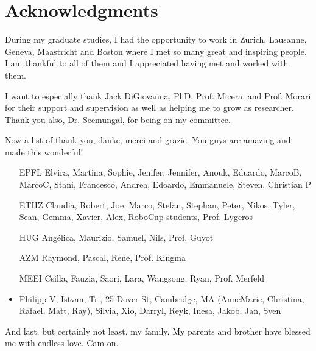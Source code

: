 
\begingroup
\let\clearpage\relax
\let\cleardoublepage\relax
\let\cleardoublepage\relax

\chapter*{Acknowledgments}
During my graduate studies, I had the opportunity to work in Zurich, Lausanne, Geneva, Maastricht and Boston where I met so many great and inspiring people. I am thankful to all of them and I appreciated having met and worked with them.

I want to especially thank Jack DiGiovanna, PhD, Prof. Micera, and Prof. Morari for their support and supervision as well as helping me to grow as researcher. Thank you also, Dr. Seemungal, for being on my committee.

Now a list of thank you, danke, merci and grazie. You guys are amazing and made this wonderful!
\begin{itemize}
\item[EPFL] Elvira, Martina, Sophie, Jenifer, Jennifer, Anouk, Eduardo, MarcoB, MarcoC, Stani, Francesco, Andrea, Edoardo, Emmanuele, Steven, Christian P
\item[ETHZ] Claudia, Robert, Joe, Marco, Stefan, Stephan, Peter, Nikos, Tyler, Sean, Gemma, Xavier, Alex, RoboCup students, Prof. Lygeros
\item[HUG] Angélica, Maurizio, Samuel, Nils, Prof. Guyot
\item[AZM] Raymond, Pascal, Rene, Prof. Kingma
\item[MEEI] Csilla, Fauzia, Saori, Lara, Wangsong, Ryan, Prof. Merfeld
\item Philipp V, Istvan, Tri, 25 Dover St, Cambridge, MA (AnneMarie, Christina, Rafael, Matt, Ray), Silvia, Xio, Darryl, Reyk, Inesa, Jakob, Jan, Sven
\end{itemize}

And last, but certainly not least, my family. My parents and brother have blessed me with endless love. Cam on.

\endgroup